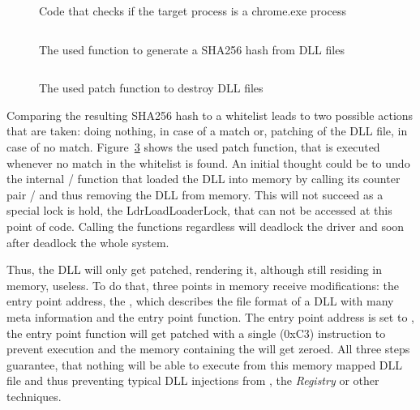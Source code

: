 \begin{figure}[h]
\inputminted[breakanywhere, breaklines,fontsize=\scriptsize, frame=single, mathescape, linenos, numbersep=5pt, numbersep=5pt, xleftmargin=0pt]{c}{sections/implementation/code4.c}
\caption{Code that checks if the target process is a chrome.exe process}
\label{code:code4}
\end{figure}
\begin{figure}[h]
\inputminted[breakanywhere, breaklines,fontsize=\scriptsize, frame=single, mathescape, linenos, numbersep=5pt, numbersep=5pt, xleftmargin=0pt]{c}{sections/implementation/code5.c}
\caption{The used function to generate a SHA256 hash from \gls{DLL} files}
\label{code:code5}
\end{figure}
\begin{figure}[h]
\inputminted[breakanywhere, breaklines,fontsize=\scriptsize, frame=single, mathescape, linenos, numbersep=5pt, numbersep=5pt, xleftmargin=0pt]{c}{sections/implementation/code6.c}
\caption{The used patch function to destroy DLL files}
\label{code:code6}
\end{figure}
Comparing the resulting SHA256 hash to a whitelist leads to two possible actions that are taken: doing nothing, in case of a match or, patching of the \gls{DLL} file, in case of no match. Figure~\ref{code:code6} shows the used patch function, that is executed whenever no match in the whitelist is found.
An initial thought could be to undo the internal / function that loaded the \gls{DLL} into memory by calling its counter pair / and thus removing the \gls{DLL} from memory. This will not succeed as a special lock is hold, the LdrLoadLoaderLock, that can not be accessed at this point of code. Calling the functions regardless will deadlock the driver and soon after deadlock the whole system. 

\medskip

Thus, the \gls{DLL} will only get patched, rendering it, although still residing in memory, useless. To do that, three points in memory receive modifications: the entry point address, the , which describes the file format of a \gls{DLL} with many meta information and the entry point function. The entry point address is set to , the entry point function will get patched with a single  (0xC3) instruction to prevent execution and the memory containing the  will get zeroed. All three steps guarantee, that nothing will be able to execute from this memory mapped \gls{DLL} file and thus preventing typical \gls{DLL} injections from , the \emph{Registry} or other techniques.

